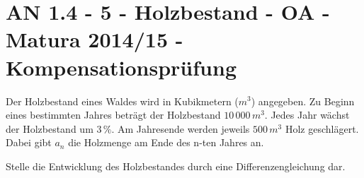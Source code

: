 \section{AN 1.4 - 5 - Holzbestand - OA - Matura 2014/15 - Kompensationsprüfung}

\begin{beispiel}[AN 1.4]{1} %
				Der Holzbestand eines Waldes wird in Kubikmetern ($m^3$) angegeben. Zu Beginn eines bestimmten Jahres beträgt der Holzbestand $10\,000\,m^3$. Jedes Jahr wächst der Holzbestand um $3\,\%$. Am Jahresende werden jeweils $500\,m^3$ Holz geschlägert. Dabei gibt $a_{n}$ die Holzmenge am Ende des n-ten Jahres an.
				
				Stelle die Entwicklung des Holzbestandes durch eine Differenzengleichung dar.\\
				
\end{beispiel}